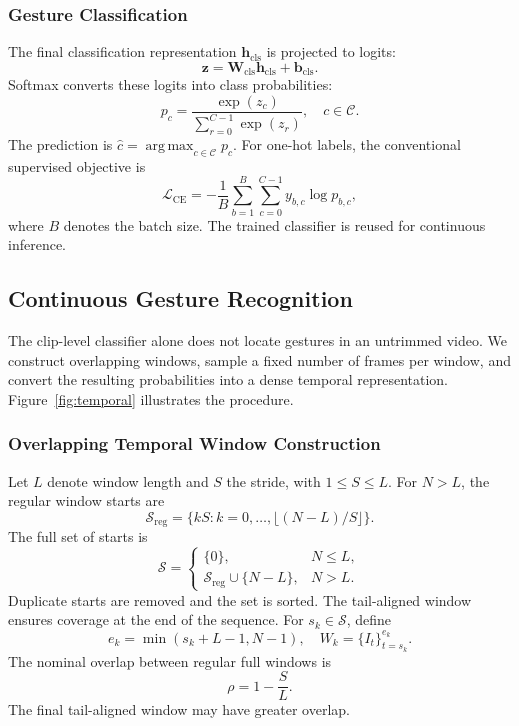 \documentclass{ieeeaccess}
\DeclareMathOperator*{\argmax}{arg\,max}
\begin{document}
\subsubsection{Gesture Classification}
The final classification representation $\mathbf h_{\mathrm{cls}}$ is projected to logits:
\begin{equation}
\mathbf z=\mathbf W_{\mathrm{cls}}\mathbf h_{\mathrm{cls}}+
\mathbf b_{\mathrm{cls}}.
\end{equation}
Softmax converts these logits into class probabilities:
\begin{equation}
p_c=\frac{\exp(z_c)}{\sum_{r=0}^{C-1}\exp(z_r)},
\quad c\in\mathcal C.
\label{eq:softmax}
\end{equation}
The prediction is $\hat c=\argmax_{c\in\mathcal C}p_c$. For one-hot labels, the conventional supervised objective is
\begin{equation}
\mathcal L_{\mathrm{CE}}=-\frac{1}{B}
\sum_{b=1}^{B}\sum_{c=0}^{C-1}y_{b,c}\log p_{b,c},
\end{equation}
where $B$ denotes the batch size. The trained classifier is reused for continuous inference.

\subsection{Continuous Gesture Recognition}
\label{sec:continuous}
The clip-level classifier alone does not locate gestures in an untrimmed video. We construct overlapping windows, sample a fixed number of frames per window, and convert the resulting probabilities into a dense temporal representation. Figure~\ref{fig:temporal} illustrates the procedure.

\subsubsection{Overlapping Temporal Window Construction}
Let $L$ denote window length and $S$ the stride, with $1\leq S\leq L$. For $N>L$, the regular window starts are
\begin{equation}
\mathcal S_{\mathrm{reg}}=
\{kS:k=0,\ldots,\lfloor(N-L)/S\rfloor\}.
\end{equation}
The full set of starts is
\begin{equation}
\mathcal S=
\begin{cases}
\{0\},&N\leq L,\\
\mathcal S_{\mathrm{reg}}\cup\{N-L\},&N>L.
\end{cases}
\label{eq:starts}
\end{equation}
Duplicate starts are removed and the set is sorted. The tail-aligned window ensures coverage at the end of the sequence. For $s_k\in\mathcal S$, define
\begin{equation}
e_k=\min(s_k+L-1,N-1),\quad
W_k=\{I_t\}_{t=s_k}^{e_k}.
\end{equation}
The nominal overlap between regular full windows is
\begin{equation}
\rho=1-\frac{S}{L}.
\end{equation}
The final tail-aligned window may have greater overlap.
\end{document}
